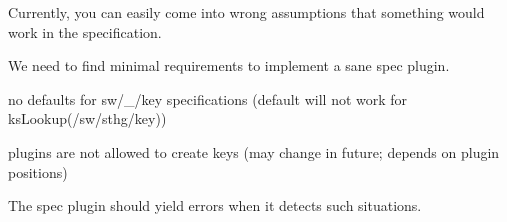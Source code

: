 Currently, you can easily come into wrong assumptions that something would work in the specification.

We need to find minimal requirements to implement a sane spec plugin.


\begin{DoxyItemize}
\item no defaults for {\ttfamily sw/\+\_\+/key} specifications (default will not work for {\ttfamily ks\+Lookup(/sw/sthg/key)})
\item plugins are not allowed to create keys (may change in future; depends on plugin positions)
\end{DoxyItemize}

The spec plugin should yield errors when it detects such situations.